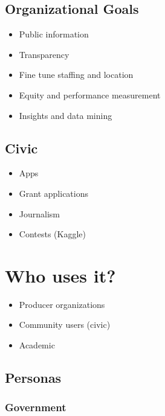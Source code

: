 \documentclass[
  openany]{book}
\providecommand{\tightlist}{%
  \setlength{\itemsep}{0pt}\setlength{\parskip}{0pt}}
\begin{document}
\hypertarget{organizational-goals}{%
\subsection{Organizational Goals}\label{organizational-goals}}

\begin{itemize}
\tightlist
\item
  Public information
\item
  Transparency
\item
  Fine tune staffing and location
\item
  Equity and performance measurement
\item
  Insights and data mining
\end{itemize}

\hypertarget{civic}{%
\subsection{Civic}\label{civic}}

\begin{itemize}
\tightlist
\item
  Apps
\item
  Grant applications
\item
  Journalism
\item
  Contests (Kaggle)
\end{itemize}

\hypertarget{who-uses-it}{%
\section{Who uses it?}\label{who-uses-it}}

\begin{itemize}
\tightlist
\item
  Producer organizations
\item
  Community users (civic)
\item
  Academic
\end{itemize}

\hypertarget{personas}{%
\subsection{Personas}\label{personas}}

\hypertarget{government}{%
\subsubsection{Government}\label{government}}
\end{document}
